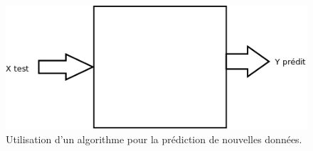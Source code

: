 % 
% 

\begin{figure}[htpb]
	\centering
	\includegraphics[scale = 0.25]{images/App_Mach_Prediction}
	\caption{Utilisation d'un algorithme pour la prédiction de nouvelles données.}
	\label{fig:Apprentissage_Machine_Prediction}
\end{figure}

